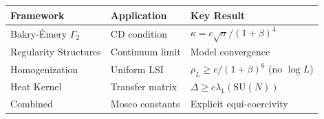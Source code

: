 \begin{center}
\begin{tabular}{|l|l|l|}
\hline
\textbf{Framework} & \textbf{Application} & \textbf{Key Result} \\
\hline
Bakry-Émery $\Gamma_2$ & CD condition & $\kappa = c\sqrt{\sigma}/(1+\beta)^4$ \\
Regularity Structures & Continuum limit & Model convergence \\
Homogenization & Uniform LSI & $\rho_L \geq c/(1+\beta)^6$ (no $\log L$) \\
Heat Kernel & Transfer matrix & $\Delta \geq c \lambda_1(\mathrm{SU}(N))$ \\
Combined & Mosco constants & Explicit equi-coercivity \\
\hline
\end{tabular}
\end{center}

\begin{center}
\end{center}








